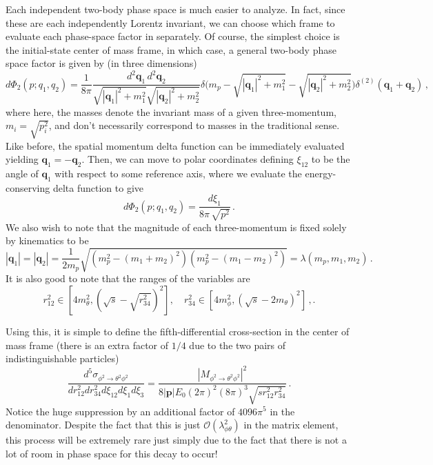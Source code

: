 \documentclass{article}
\numberwithin{equation}{subsection}
\begin{document}
Each independent two-body phase space is much easier to analyze. In fact, since these are each independently Lorentz invariant, we can choose which frame to
evaluate each phase-space factor in separately. Of course, the simplest choice is the initial-state center of mass frame, in which case, a general two-body phase space
factor is given by (in three dimensions)
\begin{equation}
	d\Phi_2(p; q_1, q_2) = \frac{1}{8\pi}\frac{d^2\mathbf{q}_1\,d^2\mathbf{q}_2}{\sqrt{|\mathbf{q}_1|^2 + m_1^2}\sqrt{|\mathbf{q}_2|^2 + m_2^2}}
		\delta\big(m_p - \sqrt{|\mathbf{q}_1|^2 + m_1^2} - \sqrt{|\mathbf{q}_2|^2 + m_2^2}\big)\delta^{(2)}(\mathbf{q}_1 + \mathbf{q}_2)\,,
\end{equation}
where here, the masses denote the invariant mass of a given three-momentum, $m_i = \sqrt{p_i^2}$, and don't necessarily correspond to masses in the traditional sense.
Like before, the spatial momentum delta function can be immediately evaluated yielding $\mathbf{q}_1 = -\mathbf{q}_2$. Then, we can move to polar coordinates
defining $\xi_{12}$ to be the angle of $\mathbf{q}_1$ with respect to some reference axis, where we evaluate the energy-conserving delta function to give
\begin{equation}
	d\Phi_2(p; q_1, q_2) = \frac{d\xi_1}{8\pi\,\sqrt{p^2}}\,.
\end{equation}
We also wish to note that the magnitude of each three-momentum is fixed solely by kinematics to be
\begin{equation}\label{eq:lambdaDef}
	|\mathbf{q}_1| = |\mathbf{q}_2| = \frac{1}{2m_p}\sqrt{(m_p^2 - (m_1 + m_2)^2)(m_p^2 - (m_1 - m_2)^2)} = \lambda(m_p, m_1, m_2)\,.
\end{equation}
It is also good to note that the ranges of the variables are 
\begin{equation}
	r_{12}^2\in [4 m_\theta^2, (\sqrt{s} - \sqrt{r_{34}^2})^2], \quad r_{34}^2\in[4m_\phi^2, (\sqrt{s} - 2m_\theta)^2]\,,.
\end{equation}

Using this, it is simple to define the fifth-differential cross-section in the center of mass frame (there is an extra factor of $1/4$
due to the two pairs of indistinguishable particles)
\begin{equation}
	\frac{d^5\sigma_{\phi^2\to\theta^2\phi^2}}{dr_{12}^2dr_{34}^2d\xi_{12}d\xi_1d\xi_3} = 
	\frac{|M_{\phi^2\to\theta^2\phi^2}|^2}{8|\mathbf{p}|E_0(2\pi)^2(8\pi)^3\sqrt{sr_{12}^2r_{34}^2}}\,.
\end{equation}
Notice the huge suppression by an additional factor of $4096\pi^5$ in the denominator. Despite the fact that this is just $\mathcal{O}(\lambda_{\phi\theta}^2)$
in the matrix element, this process will be extremely rare just simply due to the fact that there is not a lot of room in phase space for this decay to occur!
\end{document}

